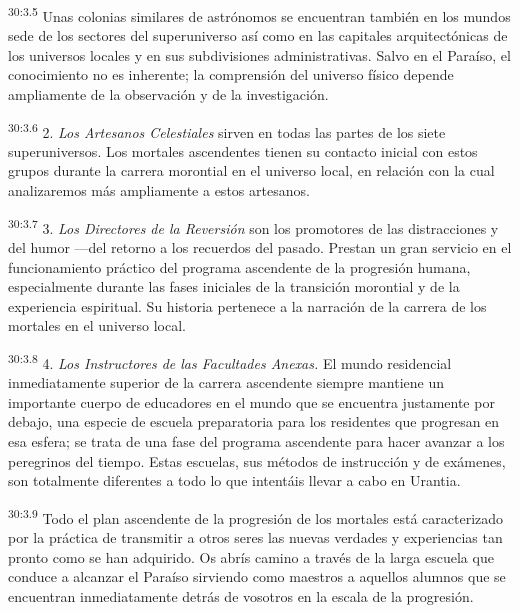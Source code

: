 \par
\textsuperscript{30:3.5} Unas colonias similares de astrónomos se encuentran también en los mundos sede de los sectores del superuniverso así como en las capitales arquitectónicas de los universos locales y en sus subdivisiones administrativas. Salvo en el Paraíso, el conocimiento no es inherente; la comprensión del universo físico depende ampliamente de la observación y de la investigación.

\par
\textsuperscript{30:3.6} 2. \textit{Los Artesanos Celestiales} sirven en todas las partes de los siete superuniversos. Los mortales ascendentes tienen su contacto inicial con estos grupos durante la carrera morontial en el universo local, en relación con la cual analizaremos más ampliamente a estos artesanos.

\par
\textsuperscript{30:3.7} 3. \textit{Los Directores de la Reversión} son los promotores de las distracciones y del humor ---del retorno a los recuerdos del pasado. Prestan un gran servicio en el funcionamiento práctico del programa ascendente de la progresión humana, especialmente durante las fases iniciales de la transición morontial y de la experiencia espiritual. Su historia pertenece a la narración de la carrera de los mortales en el universo local.

\par
\textsuperscript{30:3.8} 4. \textit{Los Instructores de las Facultades Anexas.} El mundo residencial inmediatamente superior de la carrera ascendente siempre mantiene un importante cuerpo de educadores en el mundo que se encuentra justamente por debajo, una especie de escuela preparatoria para los residentes que progresan en esa esfera; se trata de una fase del programa ascendente para hacer avanzar a los peregrinos del tiempo. Estas escuelas, sus métodos de instrucción y de exámenes, son totalmente diferentes a todo lo que intentáis llevar a cabo en Urantia.

\par
\textsuperscript{30:3.9} Todo el plan ascendente de la progresión de los mortales está caracterizado por la práctica de transmitir a otros seres las nuevas verdades y experiencias tan pronto como se han adquirido. Os abrís camino a través de la larga escuela que conduce a alcanzar el Paraíso sirviendo como maestros a aquellos alumnos que se encuentran inmediatamente detrás de vosotros en la escala de la progresión.

